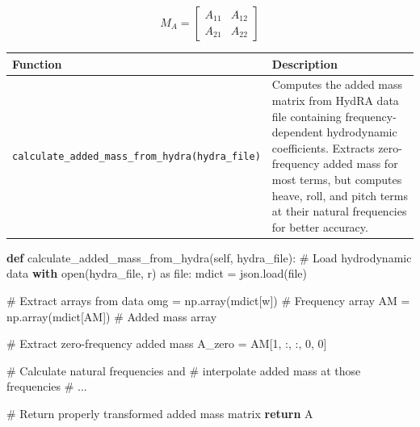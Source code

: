 \documentclass[
  letterpaper,
  DIV=11,
  numbers=noendperiod]{scrreprt}
\newenvironment{Shaded}{\begin{snugshade}}{\end{snugshade}}
\newcommand{\BuiltInTok}[1]{\textcolor[rgb]{0.00,0.23,0.31}{#1}}
\newcommand{\CommentTok}[1]{\textcolor[rgb]{0.37,0.37,0.37}{#1}}
\newcommand{\ControlFlowTok}[1]{\textcolor[rgb]{0.00,0.23,0.31}{\textbf{#1}}}
\newcommand{\DecValTok}[1]{\textcolor[rgb]{0.68,0.00,0.00}{#1}}
\newcommand{\ImportTok}[1]{\textcolor[rgb]{0.00,0.46,0.62}{#1}}
\newcommand{\KeywordTok}[1]{\textcolor[rgb]{0.00,0.23,0.31}{\textbf{#1}}}
\newcommand{\NormalTok}[1]{\textcolor[rgb]{0.00,0.23,0.31}{#1}}
\newcommand{\OperatorTok}[1]{\textcolor[rgb]{0.37,0.37,0.37}{#1}}
\newcommand{\StringTok}[1]{\textcolor[rgb]{0.13,0.47,0.30}{#1}}
\newcommand{\VariableTok}[1]{\textcolor[rgb]{0.07,0.07,0.07}{#1}}
\begin{document}
\[M_A = \begin{bmatrix} A_{11} & A_{12} \\ A_{21} & A_{22} \end{bmatrix}\]

\begin{longtable}[]{@{}
  >{\raggedright\arraybackslash}p{}
  >{\raggedright\arraybackslash}p{}@{}}
\toprule\noalign{}
\begin{minipage}[b]{\linewidth}\raggedright
Function
\end{minipage} & \begin{minipage}[b]{\linewidth}\raggedright
Description
\end{minipage} \\
\midrule\noalign{}
\endhead
\bottomrule\noalign{}
\endlastfoot
\texttt{calculate\_added\_mass\_from\_hydra(hydra\_file)} & Computes the
added mass matrix from HydRA data file containing frequency-dependent
hydrodynamic coefficients. Extracts zero-frequency added mass for most
terms, but computes heave, roll, and pitch terms at their natural
frequencies for better accuracy. \\
\end{longtable}

\begin{Shaded}
\begin{Highlighting}[]
\KeywordTok{def}\NormalTok{ calculate\_added\_mass\_from\_hydra(}\VariableTok{self}\NormalTok{, hydra\_file):}
    \CommentTok{\# Load hydrodynamic data}
    \ControlFlowTok{with} \BuiltInTok{open}\NormalTok{(hydra\_file, }\StringTok{\textquotesingle{}r\textquotesingle{}}\NormalTok{) }\ImportTok{as} \BuiltInTok{file}\NormalTok{:}
\NormalTok{        mdict }\OperatorTok{=}\NormalTok{ json.load(}\BuiltInTok{file}\NormalTok{)}
    
    \CommentTok{\# Extract arrays from data}
\NormalTok{    omg }\OperatorTok{=}\NormalTok{ np.array(mdict[}\StringTok{\textquotesingle{}w\textquotesingle{}}\NormalTok{])      }\CommentTok{\# Frequency array}
\NormalTok{    AM }\OperatorTok{=}\NormalTok{ np.array(mdict[}\StringTok{\textquotesingle{}AM\textquotesingle{}}\NormalTok{])      }\CommentTok{\# Added mass array}
    
    \CommentTok{\# Extract zero{-}frequency added mass}
\NormalTok{    A\_zero }\OperatorTok{=}\NormalTok{ AM[}\DecValTok{1}\NormalTok{, :, :, }\DecValTok{0}\NormalTok{, }\DecValTok{0}\NormalTok{]}
    
    \CommentTok{\# Calculate natural frequencies and}
    \CommentTok{\# interpolate added mass at those frequencies}
    \CommentTok{\# ...}
    
    \CommentTok{\# Return properly transformed added mass matrix}
    \ControlFlowTok{return}\NormalTok{ A}
\end{Highlighting}
\end{Shaded}
\end{document}
